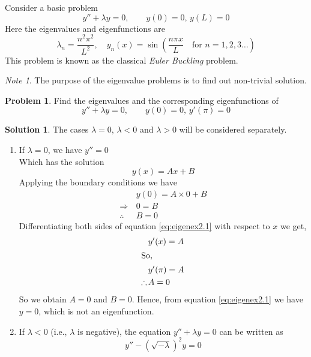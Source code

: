 \documentclass[12pt,a4paper]{article}
\theoremstyle{remark}
\newtheorem* {note}{Note}
\theoremstyle{definition}
\newtheorem{prob}{Problem}[section]
\newtheorem*{soln}{Solution}
\begin{document}
Consider a basic problem
\[
    y''+\lambda y=0,\qquad y(0)=0,\,y(L)=0
\]
Here the eigenvalues and eigenfunctions are
\[
    \lambda_n=\frac{n^2\pi^2}{L^2},\quad y_n(x)=\sin\left( \frac{n\pi x}{L}\quad \text{for } n=1,2,3\dots \right)
\]
This problem is known as the classical \emph{Euler Buckling} problem.\\
\begin{note}
    The purpose of the eigenvalue problems is to find out non-trivial solution.
\end{note}
\begin{prob}
    Find the eigenvalues and the corresponding eigenfunctions of
    \[y''+\lambda y=0,\qquad y(0)=0,\,y'(\pi)=0\]
\end{prob}
\begin{soln}
    The cases $ \lambda=0 $, $ \lambda<0 $ and $ \lambda>0 $ will be considered separately.
    \begin{enumerate}[label={Case \arabic*:}]
        \item If $ \lambda=0 $, we have $ y''=0 $\\
              Which has the solution
              \begin{equation}
                  y(x)=Ax+B
                  \label{eq:eigenex2.1}
              \end{equation}
              Applying the boundary conditions we have
              \begin{align*}
                                & y(0)=A\times 0+B \\
                  \Rightarrow\, & 0=B              \\
                  \therefore\,  & B=0
              \end{align*}
              Differentiating both sides of equation \eqref{eq:eigenex2.1} with respect to $ x $ we get,
              \begin{align*}
                               & y'(x)=A   \\
                  \intertext{So,}
                               & y'(\pi)=A \\
                  \therefore\, & A=0
              \end{align*}
              So we obtain $ A=0 $ and $ B=0 $. Hence, from equation \eqref{eq:eigenex2.1} we have $ y=0 $, which is not an eigenfunction.
        \item If $ \lambda<0 $ (i.e., $ \lambda $ is negative), the equation $ y''+\lambda y=0 $ can be written as
              \[y''-\left( \sqrt{-\lambda} \right)^2y=0\]

\end{enumerate}
\end{soln}
\end{document}

